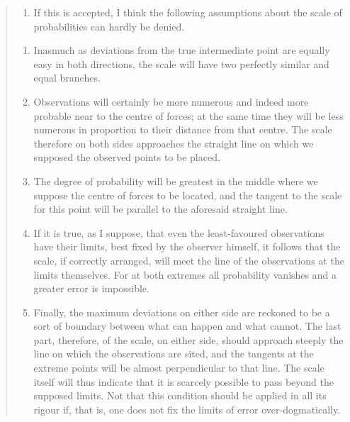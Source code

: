 \documentclass[]{book}
\providecommand{\tightlist}{%
  \setlength{\itemsep}{0pt}\setlength{\parskip}{0pt}}
\begin{document}
\begin{quote}
\begin{enumerate}
\def\labelenumi{\arabic{enumi}.}
\setcounter{enumi}{6}
\tightlist
\item
  If this is accepted, I think the following assumptions about the scale of probabilities can hardly be denied.
\end{enumerate}

\begin{enumerate}
\def\labelenumi{(\alph{enumi})}
\tightlist
\item
  Inasmuch as deviations from the true intermediate point are equally easy in both directions, the scale will have two perfectly similar and equal branches.
\item
  Observations will certainly be more numerous and indeed more probable near to the centre of forces; at the same time they will be less numerous in proportion to their distance from that centre. The scale therefore on both sides approaches the straight line on which we supposed the observed points to be placed.
\item
  The degree of probability will be greatest in the middle where we suppose the centre of forces to be located, and the tangent to the scale for this point will be parallel to the aforesaid straight line.
\item
  If it is true, as I suppose, that even the least-favoured observations have their limits, best fixed by the observer himself, it follows that the scale, if correctly arranged, will meet the line of the observations at the limits themselves. For at both extremes all probability vanishes and a greater error is impossible.
\item
  Finally, the maximum deviations on either side are reckoned to be a sort of boundary between what can happen and what cannot. The last part, therefore, of the scale, on either side, should approach steeply the line on which the observations are sited, and the tangents at the extreme points will be almost perpendicular to that line. The scale itself will thus indicate that it is scarcely possible to pass beyond the supposed limits. Not that this condition should be applied in all its rigour if, that is, one does not fix the limits of error over-dogmatically.
\end{enumerate}
\end{quote}
\end{document}
